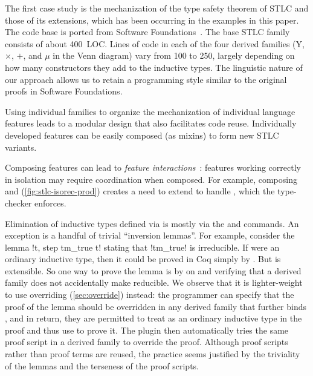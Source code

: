 



The first case study is the mechanization of the type safety theorem of
STLC and those of its extensions,
which has been occurring in the examples in this paper.
The code base is ported from Software Foundations~\cite{sf-pl}.
%
The base STLC family consists of about 400~LOC.
Lines of code in each of the four derived families
($\mathrm{Y}$, $\times$, $+$, and $\mu$ in the Venn diagram)
vary from 100 to 250, largely depending on how many constructors they
add to the inductive types.
%
The linguistic nature of our approach allows us to retain a programming
style similar to the original proofs in Software Foundations.



Using individual families to organize the mechanization of individual
language features leads to a modular design that also facilitates code reuse.
%
Individually developed features can be easily composed (as mixins) to
form new STLC variants.

Composing features can lead to \emph{feature interactions}~\cite{batory2011feature}:
features working correctly in isolation may require coordination when composed.
For example, composing  and 
(\cref{fig:stlc-isorec-prod}) creates a need to extend  to
handle , which the type-checker enforces.

Elimination of inductive types defined via  is
mostly via the  and  commands.
An exception is a handful of trivial ``inversion lemmas''.
For example, consider the lemma \lsti!\forall t, \neg step tm_true t!
stating that \lsti!tm_true! is irreducible.
If  were an ordinary inductive type, then it could be proved in Coq
simply by .
But  is extensible. So one way to prove the lemma is
by  on  and verifying that
a derived family does not accidentally make  reducible.
%
We observe that it is lighter-weight to use overriding (\cref{sec:override}) instead:
the programmer can specify that the proof of the lemma should be overridden
in any derived family that further binds ,
and in return, they are permitted to treat  as an ordinary
inductive type in the proof and thus use  to prove it.
The plugin then automatically tries the same proof script in a derived
family to override the proof. Although proof scripts rather
than proof terms are reused, the practice seems justified
by the triviality of the lemmas and the terseness of the proof scripts.

